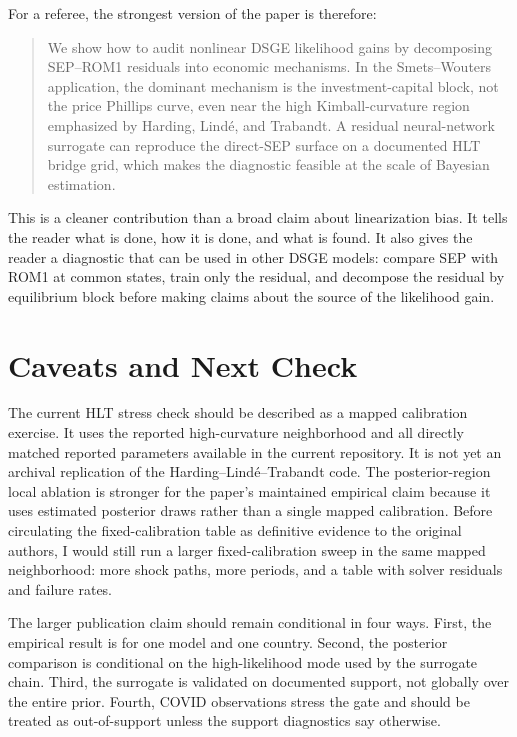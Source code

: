 \documentclass[10pt]{article}
\begin{document}
For a referee, the strongest version of the paper is therefore:
\begin{quote}
We show how to audit nonlinear DSGE likelihood gains by decomposing SEP--ROM1 residuals into economic mechanisms. In the Smets--Wouters application, the dominant mechanism is the investment-capital block, not the price Phillips curve, even near the high Kimball-curvature region emphasized by Harding, Lind\'e, and Trabandt. A residual neural-network surrogate can reproduce the direct-SEP surface on a documented HLT bridge grid, which makes the diagnostic feasible at the scale of Bayesian estimation.
\end{quote}

This is a cleaner contribution than a broad claim about linearization bias. It tells the reader what is done, how it is done, and what is found. It also gives the reader a diagnostic that can be used in other DSGE models: compare SEP with ROM1 at common states, train only the residual, and decompose the residual by equilibrium block before making claims about the source of the likelihood gain.

\section*{Caveats and Next Check}

The current HLT stress check should be described as a mapped calibration exercise. It uses the reported high-curvature neighborhood and all directly matched reported parameters available in the current repository. It is not yet an archival replication of the Harding--Lind\'e--Trabandt code. The posterior-region local ablation is stronger for the paper's maintained empirical claim because it uses estimated posterior draws rather than a single mapped calibration. Before circulating the fixed-calibration table as definitive evidence to the original authors, I would still run a larger fixed-calibration sweep in the same mapped neighborhood: more shock paths, more periods, and a table with solver residuals and failure rates.

The larger publication claim should remain conditional in four ways. First, the empirical result is for one model and one country. Second, the posterior comparison is conditional on the high-likelihood mode used by the surrogate chain. Third, the surrogate is validated on documented support, not globally over the entire prior. Fourth, COVID observations stress the gate and should be treated as out-of-support unless the support diagnostics say otherwise.
\end{document}
